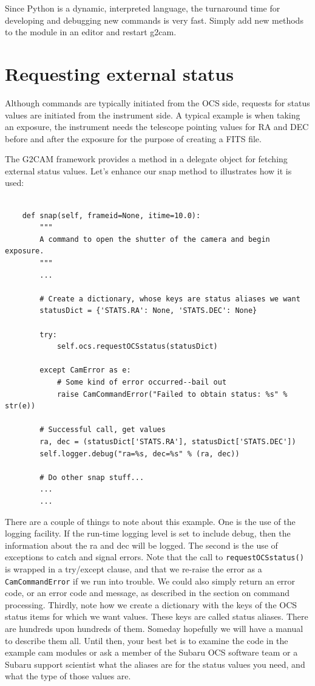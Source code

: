 \documentclass[11pt]{report}
\begin{document}
Since Python is a dynamic, interpreted language, the turnaround time for
developing and debugging new commands is very fast. Simply add new
methods to the module in an editor and restart g2cam. 

\section{Requesting external status}
Although commands are typically initiated from the OCS side, requests
for status values are initiated from the instrument side. A typical
example is when taking an exposure, the instrument needs the telescope
pointing values for RA and DEC before and after the exposure for the
purpose of creating a FITS file. 

The G2CAM framework provides a method in a delegate object for fetching
external status values. Let's enhance our snap method to illustrates how
it is used: 
\begin{verbatim}

    def snap(self, frameid=None, itime=10.0):
        """
        A command to open the shutter of the camera and begin exposure.
        """
        ...
        
        # Create a dictionary, whose keys are status aliases we want
        statusDict = {'STATS.RA': None, 'STATS.DEC': None}

        try:
            self.ocs.requestOCSstatus(statusDict)

        except CamError as e:
            # Some kind of error occurred--bail out
            raise CamCommandError("Failed to obtain status: %s" % str(e))

        # Successful call, get values
        ra, dec = (statusDict['STATS.RA'], statusDict['STATS.DEC'])
        self.logger.debug("ra=%s, dec=%s" % (ra, dec))

        # Do other snap stuff...
        ...
        ...

\end{verbatim}
There are a couple of things to note about this example. One is the use
of the logging facility. If the run-time logging level is set to include
debug, then the information about the ra and dec will be logged. The
second is the use of exceptions to catch and signal errors. Note that
the call to {\tt requestOCSstatus()} is wrapped in a try/except clause, and
that we re-raise the error as a {\tt CamCommandError} if we run into
trouble. We could also simply return an error code, or an error code and
message, as described in the section on command processing. Thirdly,
note how we create a dictionary with the keys of the OCS status items
for which we want values. These keys are called status aliases. There
are hundreds upon hundreds of them. Someday hopefully we will have a
manual to describe them all. Until then, your best bet is to examine the
code in the example cam modules or ask a member of the Subaru OCS
software team or a Subaru support scientist what the aliases are for the
status values you need, and what the type of those values are. 
\end{document}

